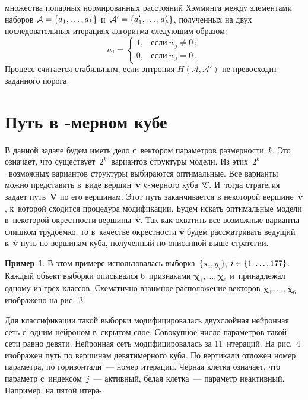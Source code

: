 \begin{multicols}{2}
\vspace*{9pt}


\addtocounter{figure}{1}




\noindent
множества попарных нормированных расстояний Хэмминга между
элементами наборов $\mathcal{A} \hm= \{a_1,\dots,a_k\}$
и~$\mathcal{A}' \hm=\{a_1',\dots,a_k'\}$, полученных на двух
последовательных итерациях алгоритма следующим образом:
\begin{equation*}
a_j = \begin{cases}
1, & \mbox{если}~w_j \neq 0\,;  \\
0, & \mbox{если}~w_j = 0\,.
\end{cases}
\end{equation*}
Процесс считается стабильным, если энтропия $H(\mathcal{A},\mathcal{A'})$
не превосходит заданного порога.

\section{Путь в {}-мерном кубе}

В данной задаче будем иметь дело с~вектором параметров размерности~$k$.
Это означает, что существует~$2^k$~вариантов структуры модели.
Из этих~$2^k$~возможных вариантов структуры выбираются оптимальные.
Все варианты можно представить в~виде вершин~$\mathbf{v}$
$k$-мер\-но\-го куба~$\mathfrak{V}$. И~тогда стратегия задает путь~$\mathbf{V}$
по его вершинам. Этот путь заканчивается в некоторой
вершине~$\mathbf{\hat{v}}$, к~которой сходится процедура
модификации. Будем искать оптимальные модели в~некоторой окрестности
вершины~$\mathbf{\hat{v}}$. Так как охватить все возможные варианты
слишком трудоемко, то в~качестве окрестности $\mathbf{\hat{v}}$
будем рассматривать ведущий к~$\mathbf{\hat{v}}$ путь по вершинам
куба, полученный по описанной выше стратегии.

\smallskip

\noindent
\textbf{Пример 1}. В этом примере использовалась
выборка~$\{\mathbf{x}_i, y_i\}$, $i\hm\in\{1,\dots,177\}$. Каждый
объект выборки описывался 6~признаками $\mathbf{\chi}_1, \dots,
\mathbf{\chi}_6$ и~принадлежал одному из трех классов. Схематично
взаимное расположение векторов $\mathbf{\chi}_1, \dots,
\mathbf{\chi}_6$ изображено на рис.~3.


Для классификации такой выборки модифицировалась двухслойная
нейронная сеть с~одним нейроном в~скрытом слое. Совокупное число
параметров такой сети равно девяти. Нейронная сеть модифицировалась
за 11~итераций. На рис.~4 изоб\-ражен путь по вершинам
девятимерного куба. По вертикали отложен номер параметра, по
горизонтали~--- номер итерации. Черная клетка означает, что параметр
с~индексом~$j$~--- активный, белая клетка~---
 параметр неактивный.
Например, на пятой итера-\linebreak\vspace*{-12pt}
\begin{center}  %
\vspace*{12pt}
\mbox{%
 \epsfxsize=74.023mm
 }


\end{center}
\end{multicols}
